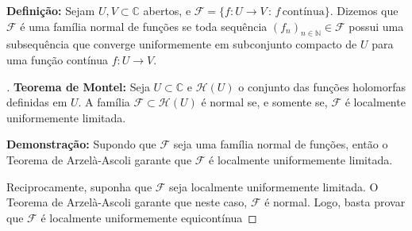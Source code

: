 \textbf{Definição: }Sejam $U,V\subset\mathbb{C}$ abertos, e $\mathcal{F} = \{f\colon U\longrightarrow V\,:\, f\,\textrm{contínua}\}$. Dizemos que $\mathcal{F}$ é uma família normal de funções se toda sequência $(f_n)_{n\in\mathbb{N}}\in\mathcal{F}$ possui uma subsequência que converge uniformemente em subconjunto compacto de $U$ para uma função contínua $f\colon U\longrightarrow V$.

\begin{proof}[]
\textbf{Teorema de Montel: }Seja $U\subset\mathbb{C}$ e $\mathcal{H}(U)$ o conjunto das funções holomorfas definidas em $U$. A família $\mathcal{F}\subset\mathcal{H}(U)$ é normal se, e somente se, $\mathcal{F}$ é localmente uniformemente limitada.

\textbf{Demonstração: } Supondo que $\mathcal{F}$ seja uma família normal de funções, então o Teorema de Arzelà-Ascoli garante que $\mathcal{F}$ é localmente uniformemente limitada.

Reciprocamente, suponha que $\mathcal{F}$ seja localmente uniformemente limitada. O Teorema de Arzelà-Ascoli garante que neste caso, $\mathcal{F}$ é normal. Logo, basta provar que $\mathcal{F}$ é localmente uniformemente equicontínua
\end{proof}

